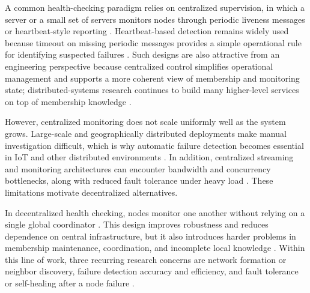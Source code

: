 A common health-checking paradigm relies on centralized supervision, in which a server or a small set of servers
monitors nodes through periodic liveness messages or heartbeat-style reporting
\cite{vanrenesseGossipStyleFailureDetection1998} \cite{kawazoeaguileraHeartbeatTimeoutfreeFailure1997}. Heartbeat-based
detection remains widely used because timeout on missing periodic messages provides a simple operational rule for
identifying suspected failures \cite{vanrenesseGossipStyleFailureDetection1998}
\cite{kawazoeaguileraHeartbeatTimeoutfreeFailure1997}. Such designs are also attractive from an engineering perspective
because centralized control simplifies operational management and supports a more coherent view of membership and
monitoring state; distributed-systems research continues to build many higher-level services on top of membership
knowledge \cite{huntZooKeeperWaitfreeCoordination}.

However, centralized monitoring does not scale uniformly well as the system grows. Large-scale and geographically
distributed deployments make manual investigation difficult, which is why automatic failure detection becomes essential
in IoT and other distributed environments \cite{yangMedleyMembershipService2022}
\cite{banerjeeHardwareAssistedHeartbeatMechanism2022}. In addition, centralized streaming and monitoring architectures
can encounter bandwidth and concurrency bottlenecks, along with reduced fault tolerance under heavy load
\cite{guoDecentralizedMultiVenueRealTime2025} \cite{weiSwarmCostEfficientVideo2024}. These limitations motivate
decentralized alternatives.

In decentralized health checking, nodes monitor one another without relying on a single global coordinator
\cite{yangMedleyMembershipService2022} \cite{nikolicSelfHealingDilemmasDistributed2021}.
This design improves robustness and reduces dependence on central infrastructure, but it also introduces harder
problems in membership maintenance, coordination, and incomplete local knowledge
\cite{nikolicSelfHealingDilemmasDistributed2021}.
Within this line of work, three recurring research concerns are network formation or neighbor discovery, failure
detection accuracy and efficiency, and fault tolerance or self-healing after a node failure
\cite{rodriguezDecentralisedSelfHealingApproach2021}.

